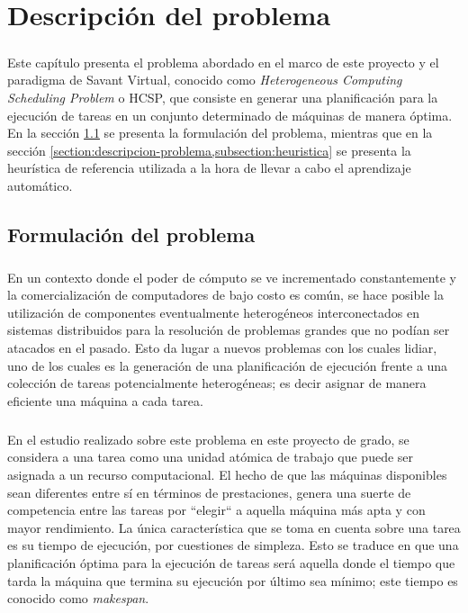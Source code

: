 \chapter{Descripción del problema} \label{section-descripcion-problema}

\paragraph{}Este capítulo presenta el problema abordado en el marco de este proyecto y el paradigma de Savant Virtual, conocido como \textit{Heterogeneous Computing Scheduling Problem} o HCSP, que consiste en generar una planificación para la ejecución de tareas en un conjunto determinado de máquinas de manera óptima. En la sección \ref{section:descripcion-problema,subsection:formulacion-problema} se presenta la formulación del problema, mientras que en la sección \ref{section:descripcion-problema,subsection:heuristica} se presenta la heurística de referencia utilizada a la hora de llevar a cabo el aprendizaje automático.

\section{Formulación del problema} \label{section:descripcion-problema,subsection:formulacion-problema}

\paragraph{}En un contexto donde el poder de cómputo se ve incrementado constantemente y la comercialización de computadores de bajo costo es común, se hace posible la utilización de componentes eventualmente heterogéneos interconectados en sistemas distribuidos para la resolución de problemas grandes que no podían ser atacados en el pasado. Esto da lugar a nuevos problemas con los cuales lidiar, uno de los cuales es la generación de una planificación de ejecución frente a una colección de tareas potencialmente heterogéneas; es decir asignar de manera eficiente una máquina a cada tarea.

\paragraph{}En el estudio realizado sobre este problema en este proyecto de grado, se considera a una tarea como una unidad atómica de trabajo que puede ser asignada a un recurso computacional. El hecho de que las máquinas disponibles sean diferentes entre sí en términos de prestaciones, genera una suerte de competencia entre las tareas por ``elegir`` a aquella máquina más apta y con mayor rendimiento. La única característica que se toma en cuenta sobre una tarea es su tiempo de ejecución, por cuestiones de simpleza. Esto se traduce en que una planificación óptima para la ejecución de tareas será aquella donde el tiempo que tarda la máquina que termina su ejecución por último sea mínimo; este tiempo es conocido como \textit{makespan}.

